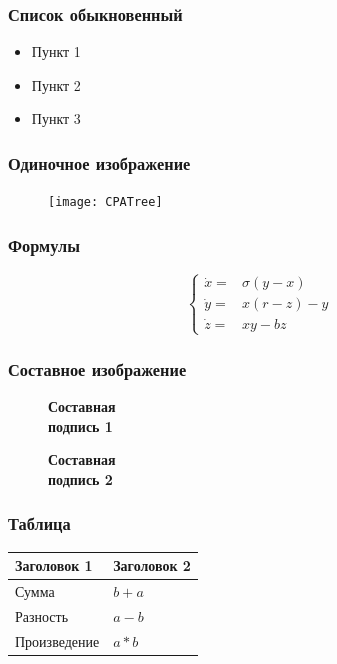 \documentclass[14pt]{beamer}
\begin{document}
\begin{frame}
\frametitle{Список обыкновенный}
\begin{itemize}
  \item Пункт 1
  \item Пункт 2
  \item Пункт 3
\end{itemize}
\end{frame}

\begin{frame}
\frametitle{Одиночное изображение}
\begin{figure}[H]
  \center
  \texttt{[image: CPATree]}
\end{figure}
\end{frame}

\begin{frame}
\frametitle{Формулы}
$$
\left\{
  \begin{array}{rl}
    \dot x = & \sigma (y-x) \\
    \dot y = & x (r - z) - y \\
    \dot z = & xy - bz
  \end{array}
\right.
$$
\end{frame}

\begin{frame}
\frametitle{Составное изображение}
\begin{figure}[h]
  \begin{minipage}[h]{0.49\linewidth}
    \textbf{Составная \\ подпись 1}
  \end{minipage}
  \hfill
  \begin{minipage}[h]{0.49\linewidth}
    \textbf{Составная \\ подпись 2}
  \end{minipage}
\end{figure}
\end{frame}

\begin{frame}
\frametitle{Таблица}
\begin{tabular}{|l|l|}
\hline
\textbf{Заголовок 1} & \textbf{Заголовок 2} \\
\hline
Сумма & $b+a$ \\
\hline
Разность & $a-b$ \\
\hline
Произведение & $a*b$ \\
\hline
\end{tabular}
\end{frame}
\end{document}

